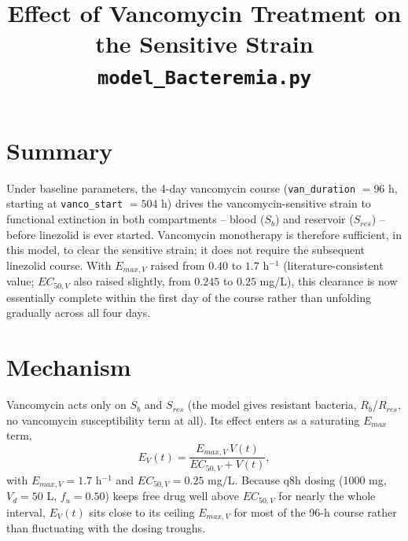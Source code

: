 \documentclass[11pt]{article}
\title{Effect of Vancomycin Treatment on the Sensitive Strain\\
\large \texttt{model\_Bacteremia.py}}
\author{}
\date{}
\begin{document}
\maketitle

\section{Summary}

Under baseline parameters, the 4-day vancomycin course
(\texttt{van\_duration} $= 96$ h, starting at \texttt{vanco\_start} $=
504$ h) drives the vancomycin-sensitive strain to functional extinction in
both compartments -- blood ($S_b$) and reservoir ($S_{res}$) -- before
linezolid is ever started. Vancomycin monotherapy is therefore sufficient,
in this model, to clear the sensitive strain; it does not require the
subsequent linezolid course. With $E_{max,V}$ raised from $0.40$ to $1.7$
h$^{-1}$ (literature-consistent value; $EC_{50,V}$ also raised slightly,
from $0.245$ to $0.25$ mg/L), this clearance is now essentially complete
within the first day of the course rather than unfolding gradually across
all four days.

\section{Mechanism}

Vancomycin acts only on $S_b$ and $S_{res}$ (the model gives resistant
bacteria, $R_b$/$R_{res}$, no vancomycin susceptibility term at all). Its
effect enters as a saturating $E_{max}$ term,
\begin{equation}
E_V(t) = \frac{E_{max,V}\, V(t)}{EC_{50,V} + V(t)},
\end{equation}
with $E_{max,V} = 1.7$ h$^{-1}$ and $EC_{50,V} = 0.25$ mg/L. Because
q8h dosing (1000 mg, $V_d = 50$ L, $f_u = 0.50$) keeps free drug well above
$EC_{50,V}$ for nearly the whole interval, $E_V(t)$ sits close to its
ceiling $E_{max,V}$ for most of the 96-h course rather than fluctuating
with the dosing troughs.
\end{document}
